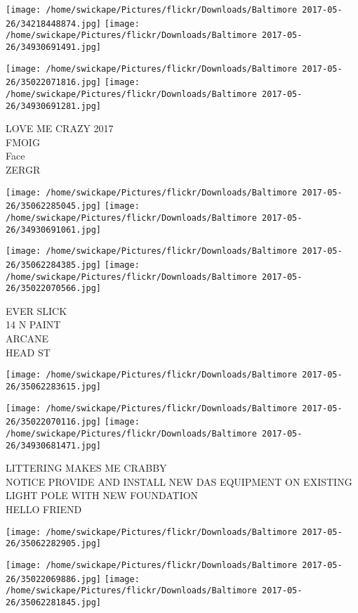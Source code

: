 \documentclass[10pt,letterpaper]{article}
\begin{document}
\texttt{[image: /home/swickape/Pictures/flickr/Downloads/Baltimore 2017-05-26/34218448874.jpg]}
\texttt{[image: /home/swickape/Pictures/flickr/Downloads/Baltimore 2017-05-26/34930691491.jpg]}

\texttt{[image: /home/swickape/Pictures/flickr/Downloads/Baltimore 2017-05-26/35022071816.jpg]}
\texttt{[image: /home/swickape/Pictures/flickr/Downloads/Baltimore 2017-05-26/34930691281.jpg]}

LOVE ME CRAZY 2017\\
FMOIG\\
Face\\
ZERGR
\pagebreak

\texttt{[image: /home/swickape/Pictures/flickr/Downloads/Baltimore 2017-05-26/35062285045.jpg]}
\texttt{[image: /home/swickape/Pictures/flickr/Downloads/Baltimore 2017-05-26/34930691061.jpg]}

\texttt{[image: /home/swickape/Pictures/flickr/Downloads/Baltimore 2017-05-26/35062284385.jpg]}
\texttt{[image: /home/swickape/Pictures/flickr/Downloads/Baltimore 2017-05-26/35022070566.jpg]}

EVER SLICK\\
14 N PAINT\\
ARCANE\\
HEAD ST
\pagebreak

\texttt{[image: /home/swickape/Pictures/flickr/Downloads/Baltimore 2017-05-26/35062283615.jpg]}

\vspace{0.25in}
\texttt{[image: /home/swickape/Pictures/flickr/Downloads/Baltimore 2017-05-26/35022070116.jpg]}
\texttt{[image: /home/swickape/Pictures/flickr/Downloads/Baltimore 2017-05-26/34930681471.jpg]}

LITTERING MAKES ME CRABBY\\
NOTICE PROVIDE AND INSTALL NEW DAS EQUIPMENT ON EXISTING LIGHT POLE WITH NEW FOUNDATION\\
HELLO FRIEND
\pagebreak

\texttt{[image: /home/swickape/Pictures/flickr/Downloads/Baltimore 2017-05-26/35062282905.jpg]}

\vspace{0.25in}
\texttt{[image: /home/swickape/Pictures/flickr/Downloads/Baltimore 2017-05-26/35022069886.jpg]}
\texttt{[image: /home/swickape/Pictures/flickr/Downloads/Baltimore 2017-05-26/35062281845.jpg]}
\end{document}
